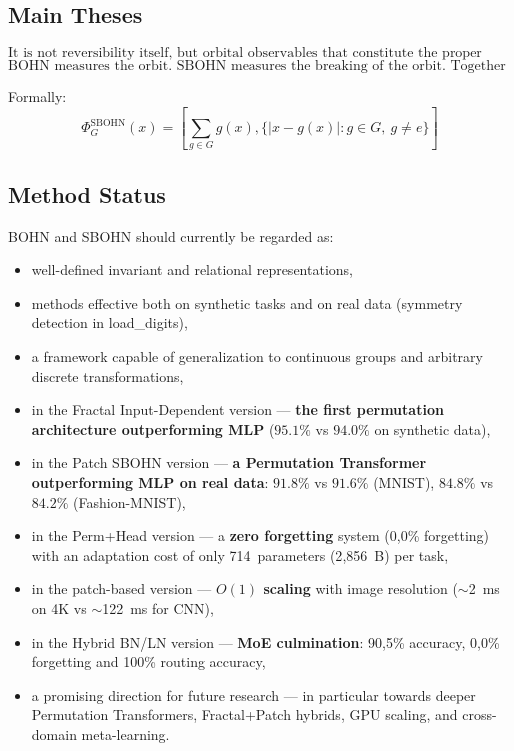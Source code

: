 \documentclass[11pt,a4paper]{report}
\begin{document}
\subsection{Main Theses}

\[
\boxed{\text{It is not reversibility itself, but orbital observables that constitute the proper representation of data.}}
\]
\[
\boxed{\text{BOHN measures the orbit. SBOHN measures the breaking of the orbit. Together --- they discover symmetry.}}
\]

Formally:
\[
\boxed{
\Phi_G^{\mathrm{SBOHN}}(x)
=\left[
\sum_{g\in G}g(x),
\{|x-g(x)|:g\in G,\ g\neq e\}
\right]
}
\]

\subsection{Method Status}

BOHN and SBOHN should currently be regarded as:
\begin{itemize}
\item well-defined invariant and relational representations,
\item methods effective both on synthetic tasks and on real data (symmetry detection in load\_digits),
\item a framework capable of generalization to continuous groups and arbitrary discrete transformations,
\item in the Fractal Input-Dependent version --- \textbf{the first permutation architecture outperforming MLP} ($95.1\%$ vs $94.0\%$ on synthetic data),
\item in the Patch SBOHN version --- \textbf{a Permutation Transformer outperforming MLP on real data}: $91.8\%$ vs $91.6\%$ (MNIST), $84.8\%$ vs $84.2\%$ (Fashion-MNIST),
\item in the Perm+Head version --- a \textbf{zero forgetting} system (0{,}0\% forgetting) with an adaptation cost of only 714~parameters (2{,}856~B) per task,
\item in the patch-based version --- \textbf{$O(1)$ scaling} with image resolution ($\sim$2~ms on 4K vs $\sim$122~ms for CNN),
\item in the Hybrid BN/LN version --- \textbf{MoE culmination}: 90{,}5\% accuracy, 0{,}0\% forgetting and 100\% routing accuracy,
\item a promising direction for future research --- in particular towards deeper Permutation Transformers, Fractal+Patch hybrids, GPU scaling, and cross-domain meta-learning.
\end{itemize}
\end{document}
